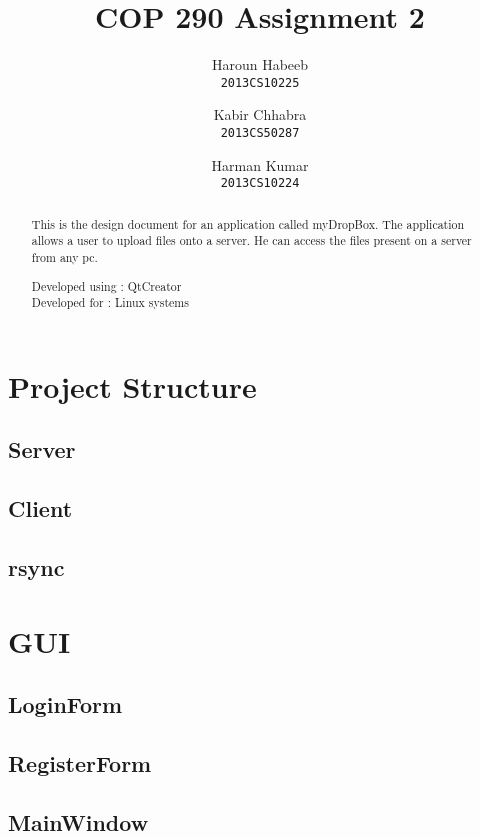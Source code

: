 \documentclass[]{article}
\begin{document}
\author{
  Haroun Habeeb\\
  \texttt{2013CS10225}
  \and
  Kabir Chhabra\\
  \texttt{2013CS50287}
  \and
  Harman Kumar\\
  \texttt{2013CS10224}
}
\title{COP 290 Assignment 2}
\maketitle

\begin{abstract}
This is the design document for an application called myDropBox. The application allows a user to upload files onto a server. He can access the files present on a server from any pc. \\
\begin{center}
 Developed using : QtCreator \\
Developed for   : Linux systems
 \end{center} 
\end{abstract}

\section{Project Structure}

\subsection{Server}
\subsection{Client}
\subsection{rsync}
\section{GUI}
\subsection{LoginForm}
\subsection{RegisterForm}
\subsection{MainWindow}
\end{document}
